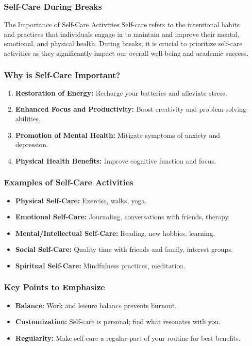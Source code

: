 \documentclass[aspectratio=169]{beamer}
\begin{document}
\begin{frame}[fragile]
    \frametitle{Self-Care During Breaks}
    \begin{block}{The Importance of Self-Care Activities}
        Self-care refers to the intentional habits and practices that individuals engage in to maintain and improve their mental, emotional, and physical health. During breaks, it is crucial to prioritize self-care activities as they significantly impact our overall well-being and academic success.
    \end{block}
\end{frame}

\begin{frame}[fragile]
    \frametitle{Why is Self-Care Important?}
    \begin{enumerate}
        \item \textbf{Restoration of Energy:} Recharge your batteries and alleviate stress.
        \item \textbf{Enhanced Focus and Productivity:} Boost creativity and problem-solving abilities.
        \item \textbf{Promotion of Mental Health:} Mitigate symptoms of anxiety and depression.
        \item \textbf{Physical Health Benefits:} Improve cognitive function and focus.
    \end{enumerate}
\end{frame}

\begin{frame}[fragile]
    \frametitle{Examples of Self-Care Activities}
    \begin{itemize}
        \item \textbf{Physical Self-Care:} Exercise, walks, yoga.
        \item \textbf{Emotional Self-Care:} Journaling, conversations with friends, therapy.
        \item \textbf{Mental/Intellectual Self-Care:} Reading, new hobbies, learning.
        \item \textbf{Social Self-Care:} Quality time with friends and family, interest groups.
        \item \textbf{Spiritual Self-Care:} Mindfulness practices, meditation.
    \end{itemize}
\end{frame}

\begin{frame}[fragile]
    \frametitle{Key Points to Emphasize}
    \begin{itemize}
        \item \textbf{Balance:} Work and leisure balance prevents burnout.
        \item \textbf{Customization:} Self-care is personal; find what resonates with you.
        \item \textbf{Regularity:} Make self-care a regular part of your routine for best benefits.
    \end{itemize}
\end{frame}
\end{document}
